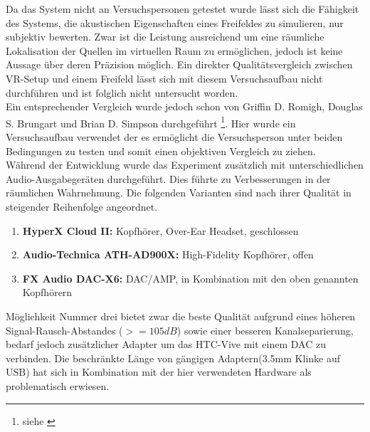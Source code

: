 

Da das System nicht an Versuchspersonen getestet wurde lässt sich die Fähigkeit des Systems, die akustischen Eigenschaften eines Freifeldes zu simulieren, nur subjektiv bewerten.
Zwar ist die Leistung ausreichend um eine räumliche Lokalisation der Quellen im virtuellen Raum zu ermöglichen, jedoch ist keine Aussage über deren Präzision möglich.
Ein direkter Qualitätsvergleich zwischen VR-Setup und einem Freifeld lässt sich mit diesem Versuchsaufbau nicht durchführen und ist folglich nicht untersucht worden.\\
Ein entsprechender Vergleich wurde jedoch schon von Griffin D. Romigh, Douglas S. Brungart und Brian D. Simpson durchgeführt \footnote{siehe \cite{FFC}}. Hier wurde ein Versuchsaufbau verwendet der es ermöglicht die Versuchsperson unter beiden Bedingungen zu testen und somit einen objektiven Vergleich zu ziehen.\\
Während der Entwicklung wurde das Experiment zusätzlich mit unterschiedlichen Audio-Ausgabegeräten durchgeführt. Dies führte zu Verbesserungen in der räumlichen Wahrnehmung.
Die folgenden Varianten sind nach ihrer Qualität in steigender Reihenfolge angeordnet.
\begin{enumerate}
\item \textbf{HyperX Cloud II:} Kopfhörer, Over-Ear Headset, geschlossen
\item \textbf{Audio-Technica ATH-AD900X:}  High-Fidelity Kopfhörer, offen
\item \textbf{FX Audio DAC-X6:} DAC/AMP, in Kombination mit den oben genannten Kopfhörern
\end{enumerate}

Möglichkeit Nummer drei bietet zwar die beste Qualität aufgrund eines höheren Signal-Rausch-Abstandes ($>= 105 dB$) sowie einer besseren Kanalseparierung, bedarf jedoch zusätzlicher Adapter um das HTC-Vive mit einem DAC zu verbinden. Die beschränkte Länge von gängigen Adaptern(3.5mm Klinke auf USB) hat sich in Kombination mit der hier verwendeten Hardware als problematisch erwiesen. 